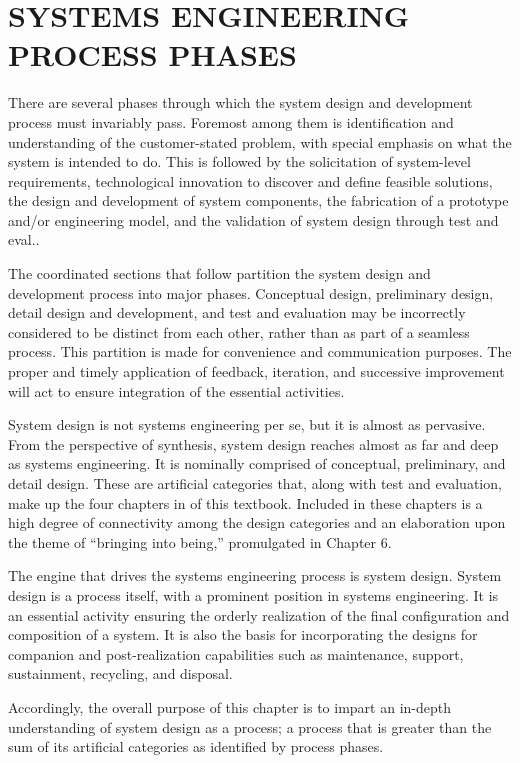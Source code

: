 \chapter{SYSTEMS ENGINEERING PROCESS PHASES}\label{chap:08}

There are several phases through which the system design and development process must invariably pass. Foremost among them is identification and understanding of the customer-stated problem, with special emphasis on what the system is intended to do. This is followed by the solicitation of system-level requirements, technological innovation to discover and define feasible solutions, the design and development of system components, the fabrication of a prototype and/or engineering model, and the validation of system design through test and eval..

The coordinated sections that follow partition the system design and development process into major phases. Conceptual design, preliminary design, detail design and development, and test and evaluation may be incorrectly considered to be distinct from each other, rather than as part of a seamless process. This partition is made for convenience and communication purposes. The proper and timely application of feedback, iteration, and successive improvement will act to ensure integration of the essential activities.

System design is not systems engineering per se, but it is almost as pervasive. From the perspective of synthesis, system design reaches almost as far and deep as systems engineering. It is nominally comprised of conceptual, preliminary, and detail design. These are artificial categories that, along with test and evaluation, make up the four chapters in of this textbook. Included in these chapters is a high degree of connectivity among the design categories and an elaboration upon the theme of ``bringing into being,'' promulgated in Chapter 6.

The engine that drives the systems engineering process is system design. System design is a process itself, with a prominent position in systems engineering. It is an essential activity ensuring the orderly realization of the final configuration and composition of a system. It is also the basis for incorporating the designs for companion and post-realization capabilities such as maintenance, support, sustainment, recycling, and disposal.

Accordingly, the overall purpose of this chapter is to impart an in-depth understanding of system design as a process; a process that is greater than the sum of its artificial categories as identified by process phases.







